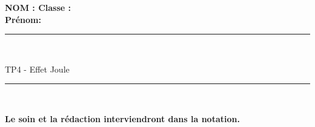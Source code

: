 \documentclass[11pt,a4paper]{article}
\begin{document}
\flushleft \textbf{NOM : \hfill Classe : \hspace{3cm} ~~\\[2mm]
Prénom:\\[0,4cm]
}
\hrule\
\\[0,2cm]

\begin{center}
 \LARGE{TP4 - Effet Joule}
\end{center}

\vspace{3 mm}

\normalsize

\hrule\
\\[0,2cm]
   \begin{center}
   \textbf{Le soin et la rédaction interviendront dans la notation.}
   \end{center} 

\vfill 



  \\
\end{document}

